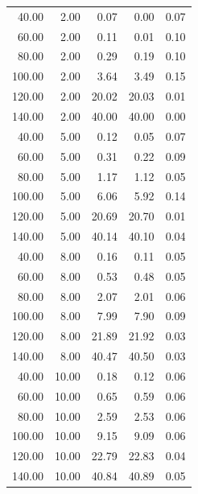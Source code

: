 \begin{longtable}{@{}rrrrr@{}}
40.00  & 2.00  & 0.07 & 0.00 & 0.07 \\
60.00  & 2.00  & 0.11 & 0.01 & 0.10 \\
80.00  & 2.00  & 0.29 & 0.19 & 0.10 \\
100.00 & 2.00  & 3.64 & 3.49 & 0.15 \\
120.00 & 2.00  & 20.02 & 20.03 & 0.01 \\
140.00 & 2.00  & 40.00 & 40.00 & 0.00 \\
40.00  & 5.00  & 0.12 & 0.05 & 0.07 \\
60.00  & 5.00  & 0.31 & 0.22 & 0.09 \\
80.00  & 5.00  & 1.17 & 1.12 & 0.05 \\
100.00 & 5.00  & 6.06 & 5.92 & 0.14 \\
120.00 & 5.00  & 20.69 & 20.70 & 0.01 \\
140.00 & 5.00  & 40.14 & 40.10 & 0.04 \\
40.00  & 8.00  & 0.16 & 0.11 & 0.05 \\
60.00  & 8.00  & 0.53 & 0.48 & 0.05 \\
80.00  & 8.00  & 2.07 & 2.01 & 0.06 \\
100.00 & 8.00  & 7.99 & 7.90 & 0.09 \\
120.00 & 8.00  & 21.89 & 21.92 & 0.03 \\
140.00 & 8.00  & 40.47 & 40.50 & 0.03 \\
40.00  & 10.00 & 0.18 & 0.12 & 0.06 \\
60.00  & 10.00 & 0.65 & 0.59 & 0.06 \\
80.00  & 10.00 & 2.59 & 2.53 & 0.06 \\
100.00 & 10.00 & 9.15 & 9.09 & 0.06 \\
120.00 & 10.00 & 22.79 & 22.83 & 0.04 \\
140.00 & 10.00 & 40.84 & 40.89 & 0.05 \\
\end{longtable}
\endgroup
